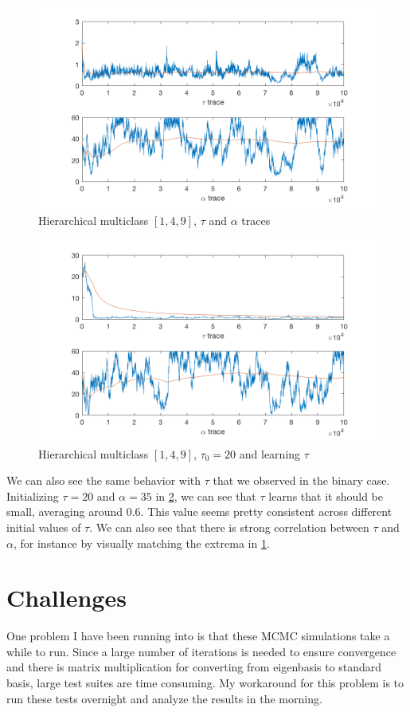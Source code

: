 \documentclass{siamart1116}
\begin{document}
    \begin{figure}[!htb]
        \centering
        \caption{\label{fig:multiclass_hier_t_a_same_trace} Hierarchical multiclass $[1, 4, 9]$, $\tau$ and $\alpha$ traces}
        \includegraphics[width=0.8\linewidth]{multiclass/hier_t_a_same/a_t_trace.png}
    \end{figure}

    \begin{figure}[!htb]
        \centering
        \caption{\label{fig:multiclass_hier_t_a_same_learn_t} Hierarchical multiclass $[1, 4, 9]$, $\tau_0 = 20$ and learning $\tau$}
        \includegraphics[width=0.8\linewidth]{multiclass/learn_t/trace.png}
    \end{figure}
    We can also see the same behavior with $\tau$ that we observed in the binary case. Initializing $\tau = 20$ and $\alpha = 35$ in \cref{fig:multiclass_hier_t_a_same_learn_t}, we can see that $\tau$ learns that it should be small, averaging around $0.6$. This value seems pretty consistent across different initial values of $\tau$. We can also see that there is strong correlation between $\tau$ and $\alpha$, for instance by visually matching the extrema in \cref{fig:multiclass_hier_t_a_same_trace}.

\section{Challenges}
    One problem I have been running into is that these MCMC simulations take a while to run. Since a large number of iterations is needed to ensure convergence and there is matrix multiplication for converting from eigenbasis to standard basis, large test suites are time consuming. My workaround for this problem is to run these tests overnight and analyze the results in the morning.
\end{document}
